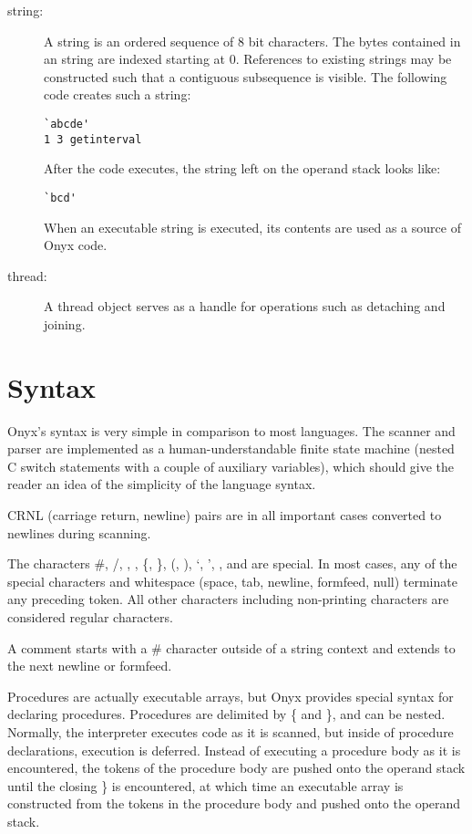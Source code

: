 \begin{description}
\item[string: ] A string is an ordered sequence of 8 bit characters.  The bytes
contained in an string are indexed starting at 0.  References to existing
strings may be constructed such that a contiguous subsequence is visible.  The
following code creates such a string:

\begin{verbatim}
`abcde'
1 3 getinterval
\end{verbatim}

After the code executes, the string left on the operand stack looks like:

\begin{verbatim}
`bcd'
\end{verbatim}

When an executable string is executed, its contents are used as a source of Onyx
code.

\item[thread: ] A thread object serves as a handle for operations such as
detaching and joining.

\end{description}

\section{Syntax}
\label{sec:onyx_syntax}
Onyx's syntax is very simple in comparison to most languages.  The scanner and
parser are implemented as a human-understandable finite state machine (nested C
switch statements with a couple of auxiliary variables), which should give the
reader an idea of the simplicity of the language syntax.

CRNL (carriage return, newline) pairs are in all important cases converted to
newlines during scanning.

The characters \#, /, {\lb}, {\rb}, \{, \}, (, ), `, ', {\lt}, and {\gt} are
special.  In most cases, any of the special characters and whitespace (space,
tab, newline, formfeed, null) terminate any preceding token.  All other
characters including non-printing characters are considered regular characters.

A comment starts with a \# character outside of a string context and extends to
the next newline or formfeed.

Procedures are actually executable arrays, but Onyx provides special syntax for
declaring procedures.  Procedures are delimited by \{ and \}, and can be
nested.  Normally, the interpreter executes code as it is scanned, but inside of
procedure declarations, execution is deferred.  Instead of executing a procedure
body as it is encountered, the tokens of the procedure body are pushed onto the
operand stack until the closing \} is encountered, at which time an executable
array is constructed from the tokens in the procedure body and pushed onto the
operand stack.

